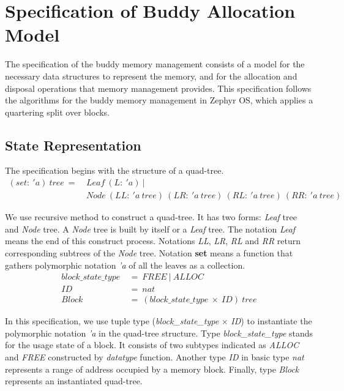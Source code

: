 \section{Specification of Buddy Allocation Model}
The specification of the buddy memory management consists of a model for the necessary data structures to represent the memory, and for the allocation and disposal operations that memory management provides. This specification follows the algorithms for the buddy memory management in Zephyr OS, which applies a quartering split over blocks.

\subsection{State Representation}
The specification begins with the structure of a quad-tree.
\begin{align*}
(set:\ 'a)\ tree\ =\ &Leaf\ (L:\ 'a)\ | \\
&Node\ (LL:\ 'a\ tree)\ (LR:\ 'a\ tree)\ (RL:\ 'a\ tree)\ (RR:\ 'a\ tree)
\end{align*}

We use recursive method to construct a quad-tree. It has two forms: \emph{Leaf} tree and \emph{Node} tree. A \emph{Node} tree is built by itself or a \emph{Leaf} tree. The notation \emph{Leaf} means the end of this construct process. Notations \emph{LL}, \emph{LR}, \emph{RL} and \emph{RR} return corresponding subtrees of the \emph{Node} tree. Notation \textbf{set} means a function that gathers polymorphic notation \emph{'a} of all the leaves as a collection.
\begin{align*}
block\_state\_type\ &=\ FREE\ |\ ALLOC \\
ID\ &=\ nat \\
Block\ &=\ (block\_state\_type\ \times\ ID)\ tree
\end{align*}

In this specification, we use tuple type (\emph{block\_state\_type} $\times$ \emph{ID}) to instantiate the polymorphic notation \emph{'a} in the quad-tree structure. Type \emph{block\_state\_type} stands for the usage state of a block. It consists of two subtypes indicated as \emph{ALLOC} and \emph{FREE} constructed by \emph{datatype} function. Another type \emph{ID} in basic type \emph{nat} represents a range of address occupied by a memory block. Finally, type \emph{Block} represents an instantiated quad-tree.

